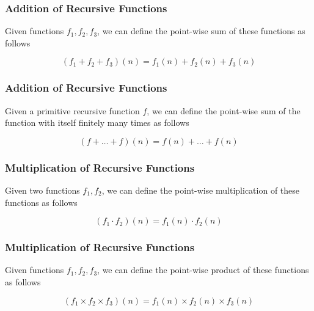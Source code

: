 \documentclass{beamer}
\begin{document}
\begin{frame}
	\frametitle{Addition of Recursive Functions}

	Given functions $f_{1},f_{2},f_{3}$, we can define the point-wise sum of these functions as follows 

	$$(f_{1} + f_{2} + f_{3})(n) = f_{1}(n) + f_{2}(n) + f_{3}(n)$$
	

	\vspace{6cm}

\end{frame}

\begin{frame}
	\frametitle{Addition of Recursive Functions}

	Given a primitive recursive function $f$, we can define the point-wise sum of the function with itself finitely many times as follows 

	$$(f + \dots + f)(n) = f(n) + \dots + f(n)$$
	
	

	\vspace{6cm}

\end{frame}

\begin{frame}
	\frametitle{Multiplication of Recursive Functions}

	Given two functions $f_{1},f_{2}$, we can define the point-wise multiplication of these functions as follows 

	$$(f_{1} \cdot f_{2})(n) = f_{1}(n) \cdot f_{2}(n)$$
	

	\vspace{6cm}

\end{frame}

\begin{frame}
	\frametitle{Multiplication of Recursive Functions}

	Given functions $f_{1},f_{2},f_{3}$, we can define the point-wise product of these functions as follows 

	$$(f_{1} \times f_{2} \times f_{3})(n) = f_{1}(n) \times f_{2}(n) \times f_{3}(n)$$
	

	\vspace{6cm}

\end{frame}
\end{document}
